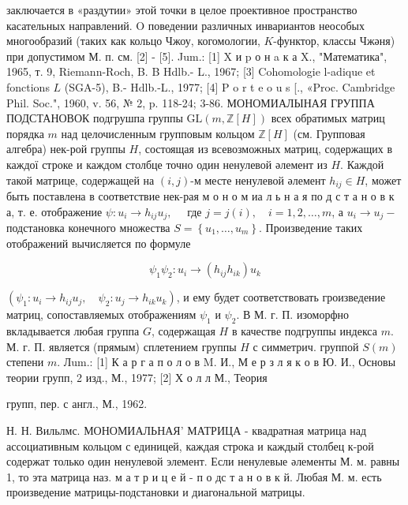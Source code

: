 \documentclass[10pt]{article}
\begin{document}
заключается в «раздутии» этой точки в целое проективное пространство касательных направлений. O поведении различных инвариантов неособых многообразий (таких как кольцо Чжоу, когомологии, $K$-функтор, классы Чжәня) при допустимом М. п. см. [2] - [5]. Jum.: [1] X и p о н a к а X., "Математика", 1965, т. 9, Riemann-Roch, B. B Hdlb.- L., 1967; [3] Cohomologie l-adique et fonctions $L$ (SGA-5), B.- Hdlb.-L., 1977; [4] P o r t e o u s [., «Proc. Cambridge Phil. Soc.", 1960, v. 56, № 2, p. 118-24; 3-86. МОНОМИАЛЫНАЯ ГРУППА ПОДСТАНОВОК подгрушпа группы $\mathrm{GL}(m, \mathbb{Z}[H])$ всех обратимых матриц порядка $m$ над целочисленным групповым кольцом $\mathbb{Z}[H]$ (см. Групповая алгебра) нек-рой группы $H$, состоящая из всевозможных матриц, содержащих в каждої строке и каждом столбце точно один ненулевой әлемент из $H$. Каждой такой матрице, содержащей на $(i, j)$-м месте ненулевой әлемент $h_{i j} \in H$, может быть поставлена в соответствие нек-рая м о н о м иа л ь н а я по д с т а н о в к а, т. е. отображение $\psi: u_{i} \rightarrow h_{i j} u_{j}, \quad$ где $j=j(i), \quad i=1,2, \ldots, m$, а $u_{i} \rightarrow u_{j}-$ подстановка конечного множества $S=\left\{u_{1}, \ldots, u_{m}\right\}$. Произведение таких отображений вычисляется по формуле



\[

\psi_{1} \psi_{2}: u_{i} \rightarrow\left(h_{i j} h_{i k}\right) u_{k}

\]



$\left(\psi_{1}: u_{i} \rightarrow h_{i j} u_{j}, \quad \psi_{2}: u_{j} \rightarrow h_{i k} u_{k}\right)$, и ему будет соответствовать гроизведение матриц, сопоставляемых отображениям $\psi_{1}$ и $\psi_{2}$. В М. г. П. изоморфно вкладывается любая группа $G$, содержащая $H$ в качестве подгруппы индекса $m$. М. г. П. является (прямым) сплетением группы $H$ с симметрич. группой $S(m)$ степени $m$. Лum.: [1] К а р г а п о л о в M. И., М е р з л я к о в Ю. И., Основы теории групп, 2 изд., М., 1977; [2] Х о л л М., Теория

групп, пер. с англ., М., 1962.

Н. Н. Вильлмс. МОНОМИАЛЬНАЯ' МАТРИЦА - квадратная матрица над ассоциативным кольцом с единицей, каждая строка и каждый столбец к-рой содержат только один ненулевой элемент. Если ненулевые әлементы М. м. равны 1, то эта матрица наз. м а т р и ц е й - п о дс т а н о в к й. Любая М. м. есть произведение матрицы-подстановки и диагональной матрицы.
\end{document}
